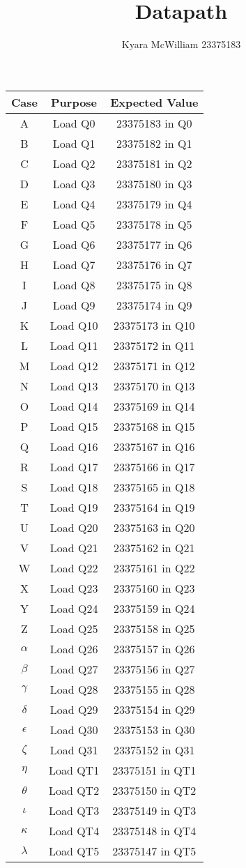 \documentclass{article}
\title{Datapath}
\author{Kyara McWilliam 23375183}
\date{}
\begin{document}
\begin{tabular}{ |c|c|c| }
\hline
Case & Purpose & Expected Value \\
\hline
A & Load Q0 & 23375183 in Q0 \\
B & Load Q1 & 23375182 in Q1\\
C & Load Q2 & 23375181 in Q2\\
D & Load Q3 & 23375180 in Q3\\
E & Load Q4 & 23375179 in Q4\\
F & Load Q5 & 23375178 in Q5\\
G & Load Q6 & 23375177 in Q6\\
H & Load Q7 & 23375176 in Q7\\
I & Load Q8 & 23375175 in Q8\\
J & Load Q9 & 23375174 in Q9\\
K & Load Q10 & 23375173 in Q10\\
L & Load Q11 & 23375172 in Q11\\
M & Load Q12 & 23375171 in Q12\\
N & Load Q13 & 23375170 in Q13\\
O & Load Q14 & 23375169 in Q14\\
P & Load Q15 & 23375168 in Q15\\
Q & Load Q16 & 23375167 in Q16\\
R & Load Q17 & 23375166 in Q17\\
S & Load Q18 & 23375165 in Q18\\
T & Load Q19 & 23375164 in Q19\\
U & Load Q20 & 23375163 in Q20\\
V & Load Q21 & 23375162 in Q21\\
W & Load Q22 & 23375161 in Q22\\
X & Load Q23 & 23375160 in Q23\\
Y & Load Q24 & 23375159 in Q24\\
Z & Load Q25 & 23375158 in Q25\\
$\alpha$ & Load Q26 & 23375157 in Q26\\
$\beta$ & Load Q27 & 23375156 in Q27\\
$\gamma$ & Load Q28 & 23375155 in Q28\\
$\delta$ & Load Q29 & 23375154 in Q29\\
$\epsilon$ & Load Q30 & 23375153 in Q30\\
$\zeta$ & Load Q31 & 23375152 in Q31\\
$\eta$ & Load QT1 & 23375151 in QT1\\
$\theta$ & Load QT2 & 23375150 in QT2\\
$\iota$ & Load QT3 & 23375149 in QT3\\
$\kappa$ & Load QT4 & 23375148 in QT4\\
$\lambda$ & Load QT5 & 23375147 in QT5\\
\hline
\end{tabular}
\end{document}
